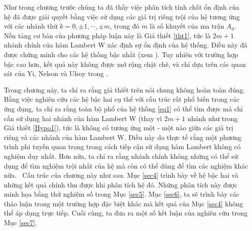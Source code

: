 %
Như trong chương trước chúng ta đã thấy việc phân tích tính chất ổn định của hệ đã được giải quyết bằng việc sử dụng các giá trị riêng trội của hệ tương ứng với các nhánh thứ 
$k = 0, \pm 1 , \cdots , \pm m$, trong đó $m$ là số khuyết của ma trận $A_d$. 
Nền tảng cơ bản của phương pháp luận này là Giả thiết \ref{tht1}, tức là $2m+1$ nhánh chính của hàm Lambert W xác định sự ổn định của hệ thống. Điều này đã được chứng minh cho các hệ thống bậc nhất (xem \cite{Shi06}). Tuy nhiên với trường hợp bậc cao hơn, kết quả này không được mở rộng chặt chẽ, và chỉ dựa trên các quan sát của Yi, Nelson và Ulsoy trong \cite{Yi07,Yi10}.

 
Trong chương này, ta chỉ ra rằng giả thiết trên nói chung không hoàn toàn đúng. Bằng việc nghiên cứu các hệ bậc hai cụ thể với cấu trúc rất phổ biến trong các ứng dụng, ta chỉ ra rằng toàn bộ phổ của hệ thống \eqref{eq1} có thể tìm được mà chỉ cần sử dụng hai nhánh của hàm Lambert W (thay vì $2m+1$ nhánh như trong Giả thiết \ref{Hypo1}), tức là không có tương ứng một - một nào giữa các giá trị riêng và các nhánh của hàm Lambert W. Điều này do thực tế rằng một phương trình phi tuyến quan trọng trong cách tiếp cận sử dụng hàm Lambert không có nghiệm duy nhất. Hơn nữa, ta chỉ ra rằng nhánh chính không những có thể sử dụng để tìm nghiệm trội nhất của hệ mà còn có thể dùng để tìm các nghiệm khác nữa. \ Cấu trúc của chương này như sau. Mục \ref{sec4} trình bày về hệ bậc hai và những kết quả chính thu được khi phân tích hệ đó. Những phân tích này được minh họa bằng thử nghiệm số trong Mục \ref{sec5}. Mục \ref{sec6}, ta sẽ trình bày các thảo luận trong một trường hợp đặc biệt khác mà kết quả của Mục \ref{sec4} không thể áp dụng trực tiếp. Cuối cùng, ta đưa ra một số kết luận của nghiên cứu trong Mục \ref{sec7}.\\

